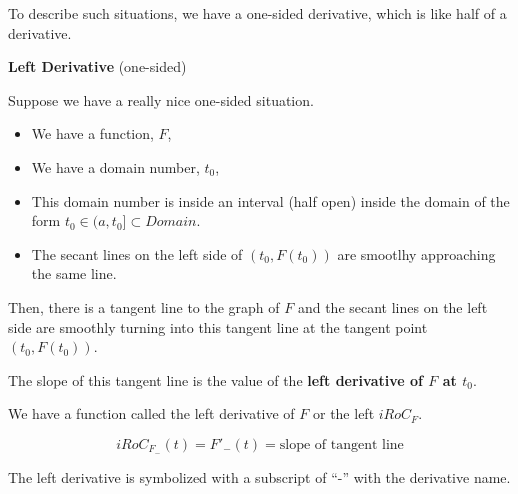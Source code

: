 \documentclass{ximera}
\begin{document}
To describe such situations, we have a one-sided derivative, which is like half of a derivative. 











\begin{definition} \textbf{\textcolor{green!50!black}{Left Derivative}}  (one-sided) 


Suppose we have a really nice one-sided situation.


\begin{itemize}
\item We have a function, $F$, 
\item We have a domain number, $t_0$, 
\item This domain number is inside an interval (half open) inside the domain of the form  $t_0 \in (a, t_0] \subset Domain$. 
\item The secant lines on the left side of $(t_0, F(t_0))$ are smootlhy approaching the same line.
\end{itemize}

Then, there is a tangent line to the graph of $F$ and the secant lines on the left side are smoothly turning into this tangent line at the tangent point $(t_0, F(t_0))$. 

The slope of this tangent line is the value of the \textbf{left derivative of $F$ at $t_0$}. 

We have a function called the left derivative of $F$ or the left $iRoC_F$.

\[
iRoC_{F_{-}}(t) =F'_{-}(t) = \text{slope of tangent line}
\]

The left derivative is symbolized with a subscript of ``-'' with the derivative name. 
 

\end{definition}
\end{document}
